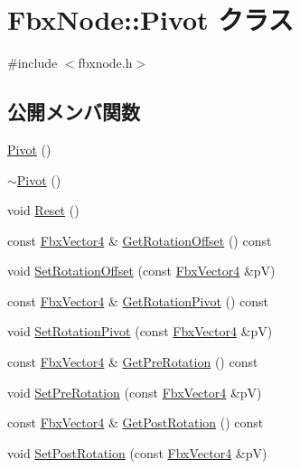 \hypertarget{class_fbx_node_1_1_pivot}{}\section{Fbx\+Node\+:\+:Pivot クラス}
\label{class_fbx_node_1_1_pivot}


{\ttfamily \#include $<$fbxnode.\+h$>$}

\subsection*{公開メンバ関数}
\begin{DoxyCompactItemize}
\item 
\hyperlink{class_fbx_node_1_1_pivot_a1c6a597612cd876db8a767826aa06f44}{Pivot} ()
\item 
\hyperlink{class_fbx_node_1_1_pivot_a7eab88240f0f17103157caa8e6b8500a}{$\sim$\+Pivot} ()
\item 
void \hyperlink{class_fbx_node_1_1_pivot_a7282010ee140c753e6f8fdaf014d9c8d}{Reset} ()
\item 
const \hyperlink{class_fbx_vector4}{Fbx\+Vector4} \& \hyperlink{class_fbx_node_1_1_pivot_ac2d8f3d1768f9e52e7ae096c15d2dcb6}{Get\+Rotation\+Offset} () const
\item 
void \hyperlink{class_fbx_node_1_1_pivot_a172c221e2a3ea853ff1e3daeb55c05e7}{Set\+Rotation\+Offset} (const \hyperlink{class_fbx_vector4}{Fbx\+Vector4} \&pV)
\item 
const \hyperlink{class_fbx_vector4}{Fbx\+Vector4} \& \hyperlink{class_fbx_node_1_1_pivot_af2640c863b393ec2540100d414ce8127}{Get\+Rotation\+Pivot} () const
\item 
void \hyperlink{class_fbx_node_1_1_pivot_abbfb38995a341d1a533fe49ea6954d5f}{Set\+Rotation\+Pivot} (const \hyperlink{class_fbx_vector4}{Fbx\+Vector4} \&pV)
\item 
const \hyperlink{class_fbx_vector4}{Fbx\+Vector4} \& \hyperlink{class_fbx_node_1_1_pivot_aeb33eb1d8182c36b1477016e0a1aad5a}{Get\+Pre\+Rotation} () const
\item 
void \hyperlink{class_fbx_node_1_1_pivot_a740d4c2bf9c3e56d067028b255ea3e8d}{Set\+Pre\+Rotation} (const \hyperlink{class_fbx_vector4}{Fbx\+Vector4} \&pV)
\item 
const \hyperlink{class_fbx_vector4}{Fbx\+Vector4} \& \hyperlink{class_fbx_node_1_1_pivot_aa3feddac1bf3ac072754b9135142278f}{Get\+Post\+Rotation} () const
\item 
void \hyperlink{class_fbx_node_1_1_pivot_a0f017a949fa3460ee06910443c808bbc}{Set\+Post\+Rotation} (const \hyperlink{class_fbx_vector4}{Fbx\+Vector4} \&pV)

\end{DoxyCompactItemize}
